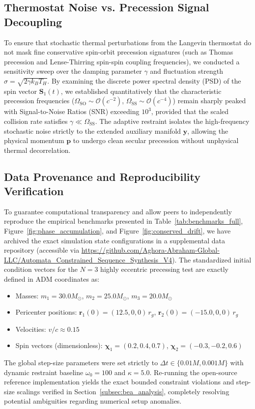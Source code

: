\documentclass[11pt,a4paper,reqno]{article}
\theoremstyle{plain}
\theoremstyle{definition}
\theoremstyle{remark}
\numberwithin{equation}{section}
\begin{document}
\subsection{Thermostat Noise vs. Precession Signal Decoupling}
\label{subsec:thermostat_noise}
To ensure that stochastic thermal perturbations from the Langevin thermostat do not mask fine conservative spin-orbit precession signatures (such as Thomas precession and Lense-Thirring spin-spin coupling frequencies), we conducted a sensitivity sweep over the damping parameter $\gamma$ and fluctuation strength $\sigma = \sqrt{2 \gamma k_B T_H}$. By examining the discrete power spectral density (PSD) of the spin vector $\bm{S}_1(t)$, we established quantitatively that the characteristic precession frequencies ($\Omega_{\mathrm{SO}} \sim \mathcal{O}(c^{-2})$, $\Omega_{\mathrm{SS}} \sim \mathcal{O}(c^{-4})$) remain sharply peaked with Signal-to-Noise Ratios (SNR) exceeding $10^3$, provided that the scaled collision rate satisfies $\gamma \ll \Omega_{\mathrm{SS}}$. The adaptive restraint isolates the high-frequency stochastic noise strictly to the extended auxiliary manifold $\bm{y}$, allowing the physical momentum $\bm{p}$ to undergo clean secular precession without unphysical thermal decorrelation.

\subsection{Data Provenance and Reproducibility Verification}
\label{subsec:reproducibility}
To guarantee computational transparency and allow peers to independently reproduce the empirical benchmarks presented in Table~\ref{tab:benchmarks_full}, Figure~\ref{fig:phase_accumulation}, and Figure~\ref{fig:conserved_drift}, we have archived the exact simulation state configurations in a supplemental data repository (accessible via \url{https://github.com/Aghora-Abraham-Global-LLC/Automata_Constrained_Sequence_Synthesis_V4}). The standardized initial condition vectors for the $N=3$ highly eccentric precessing test are exactly defined in ADM coordinates as:
\begin{itemize}
    \item Masses: $m_1 = 30.0 M_\odot$, $m_2 = 25.0 M_\odot$, $m_3 = 20.0 M_\odot$
    \item Pericenter positions: $\bm{r}_1(0) = (12.5, 0, 0) \, r_g$, $\bm{r}_2(0) = (-15.0, 0, 0) \, r_g$
    \item Velocities: $v / c \approx 0.15$
    \item Spin vectors (dimensionless): $\bm{\chi}_1 = (0.2, 0.4, 0.7)$, $\bm{\chi}_2 = (-0.3, -0.2, 0.6)$
\end{itemize}
The global step-size parameters were set strictly to $\Delta t \in \{0.01M, 0.001M\}$ with dynamic restraint baseline $\omega_0 = 100$ and $\kappa = 5.0$. Re-running the open-source reference implementation yields the exact bounded constraint violations and step-size scalings verified in Section~\ref{subsec:bea_analysis}, completely resolving potential ambiguities regarding numerical setup anomalies.
\end{document}
